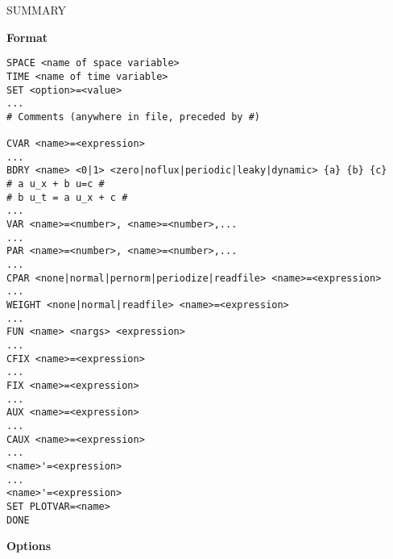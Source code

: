 
\begin{center}
{\LARGE SUMMARY}
\end{center}
\begin{center}
{\bf\Large Format}
\end{center}
\begin{verbatim}
SPACE <name of space variable>
TIME <name of time variable>
SET <option>=<value>
...
# Comments (anywhere in file, preceded by #)

CVAR <name>=<expression>
...
BDRY <name> <0|1> <zero|noflux|periodic|leaky|dynamic> {a} {b} {c}
# a u_x + b u=c #
# b u_t = a u_x + c #
...
VAR <name>=<number>, <name>=<number>,...
...
PAR <name>=<number>, <name>=<number>,...
...
CPAR <none|normal|pernorm|periodize|readfile> <name>=<expression>
...
WEIGHT <none|normal|readfile> <name>=<expression>
...
FUN <name> <nargs> <expression>
...
CFIX <name>=<expression>
...
FIX <name>=<expression>
...
AUX <name>=<expression>
...
CAUX <name>=<expression>
...
<name>'=<expression>
...
<name>'=<expression>
SET PLOTVAR=<name>
DONE
\end{verbatim}
\newpage
\begin{center}
{\bf \Large Options}
\end{center}
